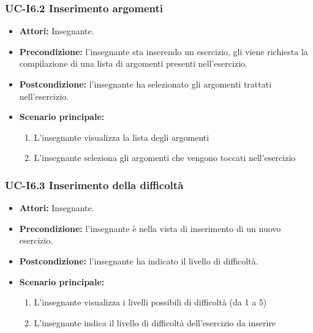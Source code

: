 \subsubsection{UC-I6.2 Inserimento argomenti}
\begin{itemize}
\item \textbf{Attori: }Insegnante.

\item \textbf{Precondizione:} l'insegnante sta inserendo un esercizio, gli viene richiesta la compilazione di una lista di argomenti presenti nell'esercizio.
\item \textbf{Postcondizione:} l'insegnante ha selezionato gli argomenti trattati nell'esercizio.
\item \textbf{Scenario principale: }
		\begin{enumerate}
		\item L'insegnante visualizza la lista degli argomenti
		\item L'insegnante seleziona gli argomenti che vengono toccati nell'esercizio
		\end{enumerate}
\end{itemize}				

\subsubsection{UC-I6.3 Inserimento della difficoltà}
\begin{itemize}
	\item \textbf{Attori: }Insegnante.
	\item \textbf{Precondizione:} l'insegnante è nella vista di inserimento di un nuovo esercizio.
	\item \textbf{Postcondizione:} l'insegnante ha indicato il livello di difficoltà.
	\item \textbf{Scenario principale:}
	\begin{enumerate}
		\item L'insegnante visualizza i livelli possibili di difficoltà (da 1 a 5)
		\item L'insegnante indica il livello di difficoltà dell'esercizio da inserire
	\end{enumerate}
\end{itemize}

